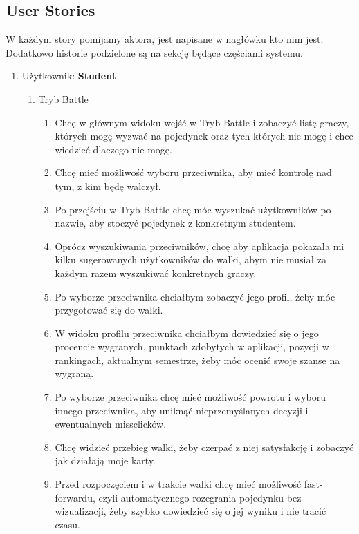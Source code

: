 \documentclass{article}
\begin{document}
\subsection{User Stories}
\begin{tcolorbox}
    W każdym story pomijamy aktora, jest napisane w nagłówku kto nim jest. Dodatkowo historie podzielone są na sekcję będące częściami systemu.

    \begin{enumerate}
        \item Użytkownik: \textbf{Student}
              \begin{enumerate}
                  \item Tryb Battle
                        \begin{enumerate}
                            \item Chcę w głównym widoku wejść w Tryb Battle i zobaczyć listę graczy, których mogę wyzwać na pojedynek oraz tych których nie mogę i chce wiedzieć dlaczego nie mogę.
                            \item Chcę mieć możliwość wyboru przeciwnika, aby mieć kontrolę nad tym, z kim będę walczył.
                            \item Po przejściu w Tryb Battle chcę móc wyszukać użytkowników po nazwie, aby stoczyć pojedynek z konkretnym studentem.
                            \item Oprócz wyszukiwania przeciwników, chcę aby aplikacja pokazała mi kilku sugerowanych użytkowników do walki, abym nie musiał za każdym razem wyszukiwać konkretnych graczy.
                            \item Po wyborze przeciwnika chciałbym zobaczyć jego profil, żeby móc przygotować się do walki.
                            \item W widoku profilu przeciwnika chciałbym dowiedzieć się o jego procencie wygranych, punktach zdobytych w aplikacji, pozycji w rankingach, aktualnym semestrze, żeby móc ocenić swoje szanse na wygraną.
                            \item Po wyborze przeciwnika chcę mieć możliwość powrotu i wyboru innego przeciwnika, aby uniknąć nieprzemyślanych decyzji i ewentualnych missclicków.
                            \item Chcę widzieć przebieg walki, żeby czerpać z niej satysfakcję i zobaczyć jak działają moje karty.
                            \item Przed rozpoczęciem i w trakcie walki chcę mieć możliwość fast-forwardu, czyli automatycznego rozegrania pojedynku bez wizualizacji, żeby szybko dowiedzieć się o jej wyniku i nie tracić czasu.

\end{enumerate}
\end{enumerate}
\end{enumerate}
\end{tcolorbox}
\end{document}
